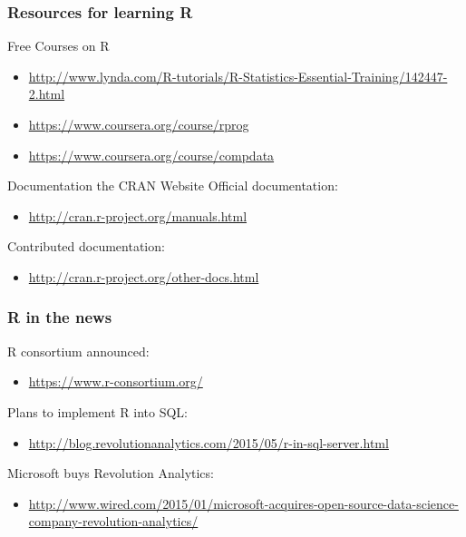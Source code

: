 \documentclass[xcolor=dvipsnames]{beamer}
\begin{document}
\begin{frame}
\frametitle{Resources for learning R}

\begin{block}{Free Courses on R}
\begin{itemize}
\item \url{http://www.lynda.com/R-tutorials/R-Statistics-Essential-Training/142447-2.html}
\newline
\item \url{https://www.coursera.org/course/rprog}
\newline
\item \url{https://www.coursera.org/course/compdata}
\end{itemize}
\end{block}

\begin{block}{Documentation the CRAN Website}
Official documentation: \begin{itemize}
\item \url{http://cran.r-project.org/manuals.html}
\newline
\end{itemize}

Contributed documentation: \begin{itemize}
\item \url{http://cran.r-project.org/other-docs.html}
\newline
\end{itemize}
\end{block}

\end{frame}

\begin{frame}
\frametitle{R in the news}
R consortium announced:
\begin{itemize}
\item \tiny \url{https://www.r-consortium.org/}
\newline
\end{itemize}

Plans to implement R into SQL:
\begin{itemize}
\item \tiny \url{http://blog.revolutionanalytics.com/2015/05/r-in-sql-server.html}
\newline
\end{itemize}

Microsoft buys Revolution Analytics:
\begin{itemize}
\item \tiny \url{http://www.wired.com/2015/01/microsoft-acquires-open-source-data-science-company-revolution-analytics/}
\newline
\end{itemize}

\end{frame}
\end{document}
